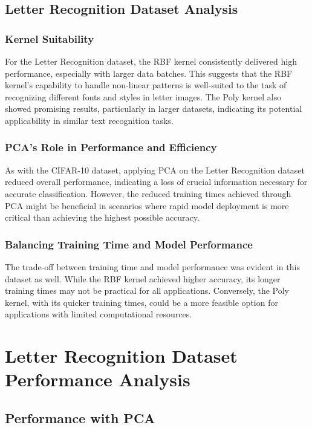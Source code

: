 \documentclass[conference]{IEEEtran}
\begin{document}
\subsection{Letter Recognition Dataset Analysis}

\subsubsection{Kernel Suitability}
For the Letter Recognition dataset, the RBF kernel consistently delivered high performance, especially with larger data batches. This suggests that the RBF kernel's capability to handle non-linear patterns is well-suited to the task of recognizing different fonts and styles in letter images. The Poly kernel also showed promising results, particularly in larger datasets, indicating its potential applicability in similar text recognition tasks.

\subsubsection{PCA's Role in Performance and Efficiency}
As with the CIFAR-10 dataset, applying PCA on the Letter Recognition dataset reduced overall performance, indicating a loss of crucial information necessary for accurate classification. However, the reduced training times achieved through PCA might be beneficial in scenarios where rapid model deployment is more critical than achieving the highest possible accuracy.

\subsubsection{Balancing Training Time and Model Performance}
The trade-off between training time and model performance was evident in this dataset as well. While the RBF kernel achieved higher accuracy, its longer training times may not be practical for all applications. Conversely, the Poly kernel, with its quicker training times, could be a more feasible option for applications with limited computational resources.

\section{Letter Recognition Dataset Performance Analysis}

\subsection{Performance with PCA}
\end{document}
